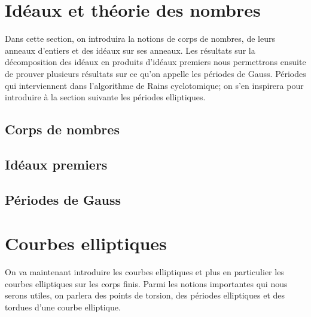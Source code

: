 \documentclass[a4paper]{article} %
\numberwithin{section}{part}
\numberwithin{equation}{section}
\newcommand\GF[1]{\mathbb{F}_{#1}}
\begin{document}
\section{Idéaux et théorie des nombres}
Dans cette section, on introduira la notions de corps de nombres, de leurs
anneaux d'entiers et des idéaux sur ses anneaux. Les résultats sur la
décomposition des idéaux en produits d'idéaux premiers nous permettrons ensuite
de prouver plusieurs résultats sur ce qu'on appelle les périodes de Gauss.
Périodes qui interviennent dans l'algorithme de Rains cyclotomique; on s'en
inspirera pour introduire à la section suivante les périodes elliptiques.

\subsection{Corps de nombres}

\subsection{Idéaux premiers}

\subsection{Périodes de Gauss}

\section{Courbes elliptiques}
On va maintenant introduire les courbes elliptiques et plus en particulier les
courbes elliptiques sur les corps finis. Parmi les notions importantes qui nous
serons utiles, on parlera des points de torsion, des périodes elliptiques et des
tordues d'une courbe elliptique.
\end{document}

